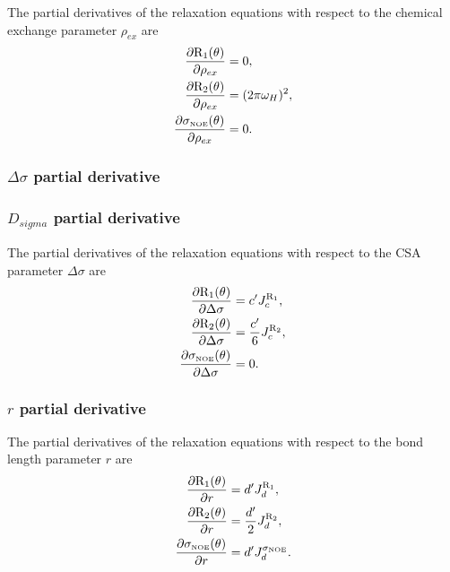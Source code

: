 The partial derivatives of the relaxation equations with respect to the chemical exchange parameter $\rho_{ex}$ are
\begin{subequations}
\begin{align}
    \frac{\partial \mathrm{R}_1(\theta)}{\partial \rho_{ex}} &= 0,          \label{eq: Ri': dR1/dRex} \\
    \frac{\partial \mathrm{R}_2(\theta)}{\partial \rho_{ex}} &= (2 \pi \omega_H)^2,          \label{eq: Ri': dR2/dRex} \\
    \frac{\partial \sigma_{\scriptscriptstyle \mathrm{NOE}}(\theta)}{\partial \rho_{ex}} &= 0.   \label{eq: Ri': dsigmaNOE/dRex}
\end{align}
\end{subequations}


\begin{latexonly}
    \subsubsection{$\Delta\sigma$ partial derivative}
\end{latexonly}
\begin{htmlonly}
    \subsubsection{$D_{sigma}$ partial derivative}
\end{htmlonly}

The partial derivatives of the relaxation equations with respect to the CSA parameter $\Delta\sigma$ are
\begin{subequations}
\begin{align}
    \frac{\partial \mathrm{R}_1(\theta)}{\partial \Delta\sigma} &= c' J_c^{\mathrm{R}_1},             \label{eq: Ri': dR1/dCSA} \\
    \frac{\partial \mathrm{R}_2(\theta)}{\partial \Delta\sigma} &= \frac{c'}{6} J_c^{\mathrm{R}_2},   \label{eq: Ri': dR2/dCSA} \\
    \frac{\partial \sigma_{\scriptscriptstyle \mathrm{NOE}}(\theta)}{\partial \Delta\sigma} &= 0.                 \label{eq: Ri': dsigmaNOE/dCSA}
\end{align}
\end{subequations}


\subsubsection{$r$ partial derivative}

The partial derivatives of the relaxation equations with respect to the bond length parameter $r$ are
\begin{subequations}
\begin{align}
    \frac{\partial \mathrm{R}_1(\theta)}{\partial r} &= d' J_d^{\mathrm{R}_1},                \label{eq: Ri': dR1/dr} \\
    \frac{\partial \mathrm{R}_2(\theta)}{\partial r} &= \frac{d'}{2} J_d^{\mathrm{R}_2},      \label{eq: Ri': dR2/dr} \\
    \frac{\partial \sigma_{\scriptscriptstyle \mathrm{NOE}}(\theta)}{\partial r} &= d' J_d^{\sigma_{\scriptscriptstyle \mathrm{NOE}}}.  \label{eq: Ri': dsigmaNOE/dr}
\end{align}
\end{subequations}



